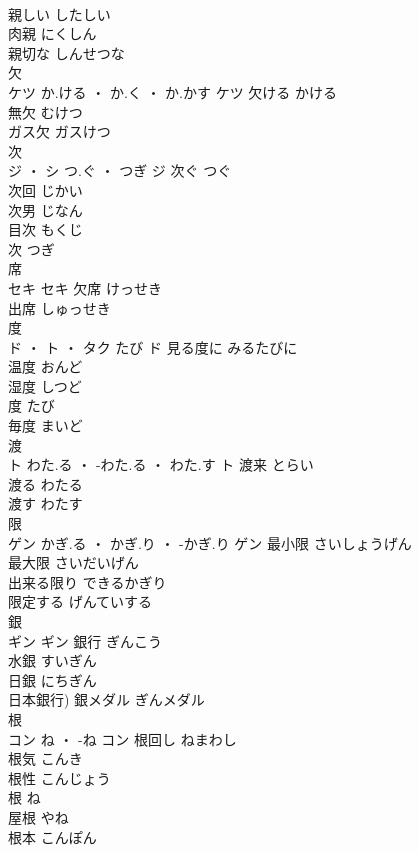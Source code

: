 \documentclass[8pt]{extreport}
\begin{document}
\begin{CJK}{UTF8}{min}
\\	親しい	したしい	
\\	肉親	にくしん	
\\	親切な	しんせつな	
\\	欠	
\\	ケツ	か.ける ・ か.く ・ か.かす	ケツ	欠ける	かける	
\\	無欠	むけつ	
\\	ガス欠	ガスけつ	
\\	次	
\\	ジ ・ シ	つ.ぐ ・ つぎ	ジ	次ぐ	つぐ	
\\	次回	じかい	
\\	次男	じなん	
\\	目次	もくじ	
\\	次	つぎ	
\\	席	
\\	セキ		セキ	欠席	けっせき	
\\	出席	しゅっせき	
\\	度	
\\	ド ・ ト ・ タク	たび	ド	見る度に	みるたびに	
\\	温度	おんど	
\\	湿度	しつど	
\\	度	たび	
\\	毎度	まいど	
\\	渡	
\\	ト	わた.る ・ -わた.る ・ わた.す	ト	渡来	とらい	
\\	渡る	わたる	
\\	渡す	わたす	
\\	限	
\\	ゲン	かぎ.る ・ かぎ.り ・ -かぎ.り	ゲン	最小限	さいしょうげん	
\\	最大限	さいだいげん	
\\	出来る限り	できるかぎり	
\\	限定する	げんていする	
\\	銀	
\\	ギン		ギン	銀行	ぎんこう	
\\	水銀	すいぎん	
\\	日銀	にちぎん	
\\	日本銀行)	銀メダル	ぎんメダル	
\\	根	
\\	コン	ね ・ -ね	コン	根回し	ねまわし	
\\	根気	こんき	
\\	根性	こんじょう	
\\	根	ね	
\\	屋根	やね	
\\	根本	こんぽん	

\end{CJK}
\end{document}
